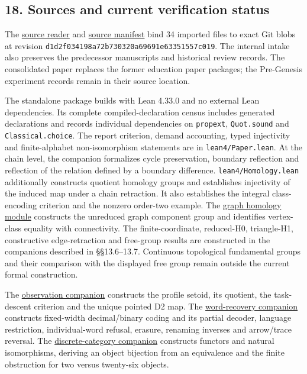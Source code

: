 \documentclass[
  11pt,
]{article}
\begin{document}
\subsection{18. Sources and current verification
status}\label{sources-and-current-verification-status}

The \href{docs/references.md}{source reader} and
\href{manifests/imported_sources.json}{source manifest} bind 34 imported
files to exact Git blobs at revision
\nolinkurl{d1d2f034198a72b730320a69691e63351557c019}. The internal intake
also preserves the predecessor manuscripts and historical review
records. The consolidated paper replaces the former education paper
packages; the Pre-Genesis experiment records remain in their source
location.

The standalone package builds with Lean 4.33.0 and no external Lean
dependencies. Its complete compiled-declaration census includes
generated declarations and records individual dependencies on
\nolinkurl{propext}, \nolinkurl{Quot.sound} and \nolinkurl{Classical.choice}. The
report criterion, demand accounting, typed injectivity and
finite-alphabet non-isomorphism statements are in
\nolinkurl{lean4/Paper.lean}. At the chain level, the companion formalizes
cycle preservation, boundary reflection and reflection of the relation
defined by a boundary difference. \nolinkurl{lean4/Homology.lean}
additionally constructs quotient homology groups and establishes
injectivity of the induced map under a chain retraction. It also
establishes the integral class-encoding criterion and the nonzero
order-two example. The \href{lean4/GraphHomology.lean}{graph homology
module} constructs the unreduced graph component group and identifies
vertex-class equality with connectivity. The finite-coordinate,
reduced-H0, triangle-H1, constructive edge-retraction and free-group
results are constructed in the companions described in §§13.6--13.7.
Continuous topological fundamental groups and their comparison with the
displayed free group remain outside the current formal construction.

The \href{lean4/Observation.lean}{observation companion} constructs the
profile setoid, its quotient, the task-descent criterion and the unique
pointed D2 map. The \href{lean4/WordRecovery.lean}{word-recovery
companion} constructs fixed-width decimal/binary coding and its partial
decoder, language restriction, individual-word refusal, erasure,
renaming inverses and arrow/trace reversal. The
\href{lean4/DiscreteCategory.lean}{discrete-category companion}
constructs functors and natural isomorphisms, deriving an object
bijection from an equivalence and the finite obstruction for two versus
twenty-six objects.
\end{document}
